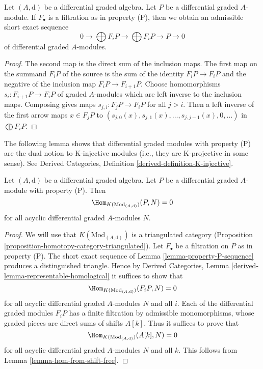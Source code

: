 \begin{lemma}
\label{lemma-property-P-sequence}
Let $(A, \text{d})$ be a differential graded algebra.
Let $P$ be a differential graded $A$-module. If $F_\bullet$
is a filtration as in property (P), then we obtain an
admissible short exact sequence
$$
0 \to
\bigoplus\nolimits F_iP \to
\bigoplus\nolimits F_iP \to P \to 0
$$
of differential graded $A$-modules.
\end{lemma}

\begin{proof}
The second map is the direct sum of the inclusion maps.
The first map on the summand $F_iP$ of the source is the sum
of the identity $F_iP \to F_iP$ and the negative of the inclusion
map $F_iP \to F_{i + 1}P$. Choose homomorphisms $s_i : F_{i + 1}P \to F_iP$
of graded $A$-modules which are left inverse to the inclusion maps.
Composing gives maps $s_{j, i} : F_jP \to F_iP$ for all $j > i$.
Then a left inverse of the first arrow maps $x \in F_jP$ to
$(s_{j, 0}(x), s_{j, 1}(x), \ldots, s_{j, j - 1}(x), 0, \ldots)$
in $\bigoplus F_iP$.
\end{proof}

\noindent
The following lemma shows that differential graded modules with
property (P) are the dual notion to K-injective modules
(i.e., they are K-projective in some sense). See
Derived Categories, Definition \ref{derived-definition-K-injective}.

\begin{lemma}
\label{lemma-property-P-K-projective}
Let $(A, \text{d})$ be a differential graded algebra.
Let $P$ be a differential graded $A$-module with property (P).
Then
$$
\Hom_{K(\text{Mod}_{(A, \text{d})})}(P, N) = 0
$$
for all acyclic differential graded $A$-modules $N$.
\end{lemma}

\begin{proof}
We will use that $K(\text{Mod}_{(A, \text{d})})$ is a triangulated
category (Proposition \ref{proposition-homotopy-category-triangulated}).
Let $F_\bullet$ be a filtration on $P$ as in property (P).
The short exact sequence of Lemma \ref{lemma-property-P-sequence}
produces a distinguished triangle. Hence by
Derived Categories, Lemma \ref{derived-lemma-representable-homological}
it suffices to show that
$$
\Hom_{K(\text{Mod}_{(A, \text{d})})}(F_iP, N) = 0
$$
for all acyclic differential graded $A$-modules $N$ and all $i$.
Each of the differential graded modules $F_iP$ has a finite filtration
by admissible monomorphisms, whose graded pieces are direct sums
of shifts $A[k]$. Thus it suffices to prove that
$$
\Hom_{K(\text{Mod}_{(A, \text{d})})}(A[k], N) = 0
$$
for all acyclic differential graded $A$-modules $N$ and all $k$.
This follows from Lemma \ref{lemma-hom-from-shift-free}.
\end{proof}

